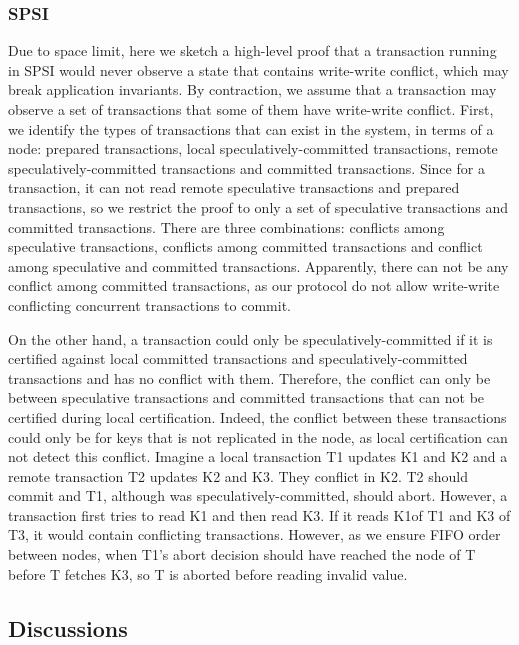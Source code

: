 \subsubsection{SPSI} 
Due to space limit, here we sketch a high-level proof that a transaction running in SPSI would never observe a state that contains write-write conflict, which may break application invariants. By contraction, we assume that a transaction may observe a set of transactions that some of them have write-write conflict. First, we identify the types of transactions that can exist in the system, in terms of a node: prepared transactions, local speculatively-committed transactions, remote speculatively-committed transactions and committed transactions. Since for a transaction, it can not read remote speculative transactions and prepared transactions, so we restrict the proof to only a set of speculative transactions and committed transactions. There are three combinations: conflicts among speculative transactions, conflicts among committed transactions and conflict among speculative and committed transactions. Apparently, there can not be any conflict among committed transactions, as our protocol do not allow write-write conflicting concurrent transactions to commit. 

On the other hand, a transaction could only be speculatively-committed if it is certified against local committed transactions and speculatively-committed transactions and has no conflict with them. Therefore, the conflict can only be between speculative transactions and committed transactions that can not be certified during local certification. Indeed, the conflict between these transactions could only be for keys that is not replicated in the node, as local certification can not detect this conflict. Imagine a local transaction T1 updates K1 and K2 and a remote transaction T2 updates K2 and K3. They conflict in K2. T2 should commit and T1, although was speculatively-committed, should abort. However, a transaction first tries to read K1 and then read K3. If it reads K1of T1 and K3 of T3, it would contain conflicting transactions. However, as we ensure FIFO order between nodes, when T1's abort decision should have reached the node of T before T fetches K3, so T is aborted before reading invalid value.

\subsection{Discussions}
